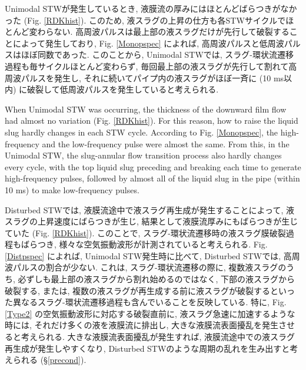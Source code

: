 \documentclass[12pt]{article}
\begin{document}
Unimodal STWが発生しているとき, 液膜流の厚みにはほとんどばらつきがなかった (Fig. \ref{RDKhist}). 
このため, 液スラグの上昇の仕方も各STWサイクルでほとんど変わらない. 
高周波パルスは最上部の液スラグだけが先行して破裂することによって発生しており, Fig. \ref{Monopspec} によれば, 高周波パルスと低周波パルスはほぼ同数であった. 
このことから, Unimodal STWでは, スラグ-環状流遷移過程も毎サイクルほとんど変わらず, 毎回最上部の液スラグが先行して割れて高周波パルスを発生し, それに続いてパイプ内の液スラグがほぼ一斉に (10 ms以内) に破裂して低周波パルスを発生していると考えられる.

When Unimodal STW was occurring, the thickness of the downward film flow had almost no variation (Fig. \ref{RDKhist}).
For this reason, how to raise the liquid slug hardly changes in each STW cycle.
According to Fig. \ref{Monopspec}, the high-frequency and the low-frequency pulse were almost the same.
From this, in the Unimodal STW, the slug-annular flow transition process also hardly changes every cycle, with the top liquid slug preceding and breaking each time to generate high-frequency pulses, followed by almost all of the liquid slug in the pipe (within 10 ms) to make low-frequency pulses.


Disturbed STWでは, 液膜流途中で液スラグ再生成が発生することによって, 液スラグの上昇速度にばらつきが生じ, 結果として液膜流厚みにもばらつきが生じていた (Fig. \ref{RDKhist}). 
このことで, スラグ-環状流遷移時の液スラグ膜破裂過程もばらつき, 様々な空気振動波形が計測されていると考えられる. 
Fig. \ref{Distpspec} によれば, Unimodal STW発生時に比べて, Disturbed STWでは, 高周波パルスの割合が少ない. 
これは, スラグ-環状流遷移の際に, 複数液スラグのうち, 必ずしも最上部の液スラグから割れ始めるのではなく, 下部の液スラグから破裂する, または, 複数の液スラグが再生成する前に液スラグが破裂するといった異なるスラグ-環状流遷移過程も含んでいることを反映している.
特に, Fig. \ref{Type2} の空気振動波形に対応する破裂直前に, 液スラグ急速に加速するような時には, それだけ多くの液を液膜流に排出し, 大きな液膜流表面擾乱を発生させると考えられる. 大きな液膜流表面擾乱が発生すれば, 液膜流途中での液スラグ再生成が発生しやすくなり, Disturbed STWのような周期の乱れを生み出すと考えられる (\S \ref{precond}). 
\end{document}
